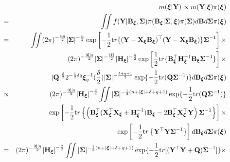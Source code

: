 \documentclass[]{book}
\begin{document}
\begin{eqnarray*}
&&m({\boldsymbol \xi}|{\bf Y}) \propto m({\bf Y}|{\boldsymbol \xi})\pi({\boldsymbol \xi})\\
&=&\iint f({\bf Y}|{\bf B}_{{\boldsymbol \xi}},{\boldsymbol \Sigma})\pi({\bf B}_{{\boldsymbol \xi}}|{\boldsymbol \Sigma}, {\boldsymbol \xi}) \pi({\boldsymbol \Sigma}) d{\bf B}d{\boldsymbol \Sigma}\pi({\boldsymbol \xi})\\
&=&\iint (2\pi)^{-\frac{nq}{2}}|{\boldsymbol \Sigma}|^{-\frac{n}{2}}\exp \left[-\frac{1}{2}{\text tr}\{({\bf Y}-{\bf X}_{{\boldsymbol \xi}}{\bf B}_{{\boldsymbol \xi}})^{{\top}}({\bf Y}-{\bf X}_{{\boldsymbol \xi}}{\bf B}_{{\boldsymbol \xi}})\}{\boldsymbol \Sigma}^{-1} \right]\times\\
&&(2\pi)^{-\frac{|{\boldsymbol \xi}| q}{2}}|{\boldsymbol \Sigma}|^{-\frac{|{\boldsymbol \xi}|}{2}} {|{\bf H}_{{\boldsymbol \xi}}}|^{-\frac{q}{2}}\exp \left[\frac{1}{2}{\text tr}\{{\bf B}_{{\boldsymbol \xi}}^{{\top}}{\bf H}_{{\boldsymbol \xi}}^{-1}{\bf B}_{{\boldsymbol \xi}}{\boldsymbol \Sigma}^{-1} \}  \right] \times \\
&& |{\bf Q}|^{\frac{\delta}{2}}2^{-\frac{1}{2}\delta q}{\boldsymbol \xi}_q^{-1}(\frac{\delta}{2}) |{\boldsymbol \Sigma}|^{-\frac{\delta + q + 1}{2}}\exp\{-\frac{1}{2}{\text tr}({\bf Q}{\boldsymbol \Sigma}^{-1}) \}d{\bf B}_{{\boldsymbol \xi}} d{\boldsymbol \Sigma}\pi({\boldsymbol \xi})\\
&\propto& (2\pi)^{-\frac{|{\boldsymbol \xi}| q}{2}}{|{\bf H}_{{\boldsymbol \xi}}|}^{-\frac{q}{2}}\iint |{\boldsymbol \Sigma}|^{-\frac{1}{2}(n+|{\boldsymbol \xi}|+\delta+q+1)}\exp\{-\frac{1}{2}{\text tr}({\bf Q}{\boldsymbol \Sigma}^{-1}) \} \\
&&\exp\left[-\frac{1}{2}{\text tr}\left\{\left({\bf B}_{{\boldsymbol \xi}}^{{\top}}({\bf X}_{{\boldsymbol \xi}}^{{\top}}{\bf X}_{{\boldsymbol \xi}}+{\bf H}_{{\boldsymbol \xi}}^{-1}){\bf B}_{{\boldsymbol \xi}}-2{\bf B}_{{\boldsymbol \xi}}^{{\top}}{\bf X}_{{\boldsymbol \xi}}^{{\top}}{\bf Y}\right){\boldsymbol \Sigma}^{-1}\right\}\right]\times \\
&&\exp\left[-\frac{1}{2}{\text tr}\left\{{\bf Y}^{{\top}}{\bf Y}{\boldsymbol \Sigma}^{-1} \right\}  \right]d{\bf B}_{{\boldsymbol \xi}} d{\boldsymbol \Sigma}\pi({\boldsymbol \xi})\\
&=& (2\pi)^{-\frac{|{\boldsymbol \xi}| q}{2}}{|{\bf H}_{{\boldsymbol \xi}}|}^{-\frac{q}{2}}\iint |{\boldsymbol \Sigma}|^{-\frac{1}{2}(n+|{\boldsymbol \xi}|+\delta+q+1)}\exp\{-\frac{1}{2}{\text tr}[({\bf Y}^{{\top}}{\bf Y}+{\bf Q}){\boldsymbol \Sigma}^{-1}]\}\times \\

\end{eqnarray*}
\end{document}
